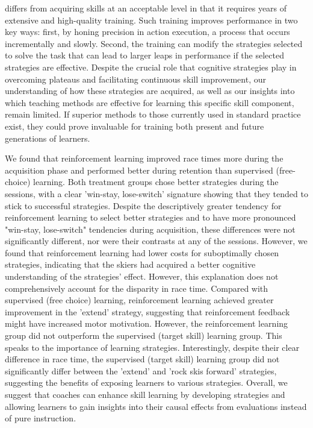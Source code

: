 differs from acquiring skills at an acceptable level in that it requires years of extensive and high-quality training. Such training improves performance in two key ways: first, by honing precision in action execution, a process that occurs incrementally and slowly. Second, the training can modify the strategies selected to solve the task that can lead to larger leaps in performance if the selected strategies are effective. Despite the crucial role that cognitive strategies play in overcoming plateaus and facilitating continuous skill improvement, our understanding of how these strategies are acquired, as well as our insights into which teaching methods are effective for learning this specific skill component, remain limited. If superior methods to those currently used in standard practice exist, they could prove invaluable for training both present and future generations of learners.




We found that reinforcement learning improved race times more during the acquisition phase and performed better during retention than supervised (free-choice) learning. Both treatment groups chose better strategies during the sessions, with a clear 'win-stay, lose-switch' signature showing that they tended to stick to successful strategies. Despite the descriptively greater tendency for reinforcement learning to select better strategies and to have more pronounced "win-stay, lose-switch" tendencies during acquisition, these differences were not significantly different, nor were their contrasts at any of the sessions. However, we found that reinforcement learning had lower costs for suboptimally chosen strategies, indicating that the skiers had acquired a better cognitive understanding of the strategies' effect. However, this explanation does not comprehensively account for the disparity in race time. Compared with supervised (free choice) learning, reinforcement learning achieved greater improvement in the 'extend' strategy, suggesting that reinforcement feedback might have increased motor motivation. However, the reinforcement learning group did not outperform the supervised (target skill) learning group. This speaks to the importance of learning strategies. Interestingly, despite their clear difference in race time, the supervised (target skill) learning group did not significantly differ between the 'extend' and 'rock skis forward' strategies, suggesting the benefits of exposing learners to various strategies. Overall, we suggest that coaches can enhance skill learning by developing strategies and allowing learners to gain insights into their causal effects from evaluations instead of pure instruction.



